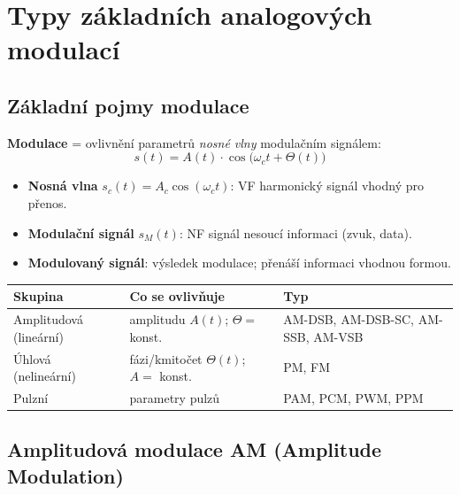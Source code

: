 \documentclass[12pt,a4paper]{article}
\begin{document}
\newpage
\section{Typy základních analogových modulací}

\begin{hvezdBox}
\subsection*{Základní pojmy modulace}
\end{hvezdBox}

\textbf{Modulace} = ovlivnění parametrů \emph{nosné vlny} modulačním signálem:
\[
  s(t) = A(t)\cdot\cos\!\bigl(\omega_c t + \Theta(t)\bigr)
\]

\begin{itemize}
  \item \textbf{Nosná vlna} $s_c(t) = A_c\cos(\omega_c t)$: VF harmonický signál vhodný pro přenos.
  \item \textbf{Modulační signál} $s_M(t)$: NF signál nesoucí informaci (zvuk, data).
  \item \textbf{Modulovaný signál}: výsledek modulace; přenáší informaci vhodnou formou.
\end{itemize}

\begin{center}
\begin{tabular}{lll}
\toprule
\textbf{Skupina} & \textbf{Co se ovlivňuje} & \textbf{Typ} \\
\midrule
Amplitudová (lineární) & amplitudu $A(t)$; $\Theta = $ konst. & AM-DSB, AM-DSB-SC, AM-SSB, AM-VSB \\
Úhlová (nelineární) & fázi/kmitočet $\Theta(t)$; $A = $ konst. & PM, FM \\
Pulzní & parametry pulzů & PAM, PCM, PWM, PPM \\
\bottomrule
\end{tabular}
\end{center}

\begin{hvezdBox}
\subsection*{Amplitudová modulace AM (Amplitude Modulation)}
\end{hvezdBox}
\end{document}
